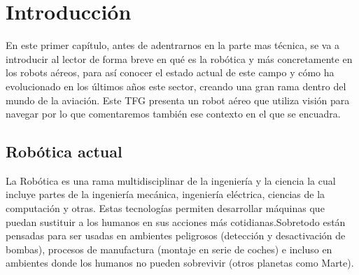 \chapter{Introducción}\label{cap.introduccion}
\hspace{1cm} En este primer capítulo, antes de adentrarnos en la parte mas técnica, se va a introducir al lector de forma breve en qué es la robótica y más concretamente en los robots aéreos, para así conocer el estado actual de este campo y cómo ha evolucionado en los últimos años este sector, creando una gran rama dentro del mundo de la aviación. Este TFG presenta un robot aéreo que utiliza visión para navegar por lo que comentaremos también ese contexto en el que se encuadra.

\section{Robótica actual}
\hspace{1cm} La Robótica es una rama multidisciplinar de la ingeniería y la ciencia la cual incluye partes de la ingeniería mecánica, ingeniería eléctrica, ciencias de la computación y otras. Estas tecnologías permiten desarrollar máquinas que puedan sustituir a los humanos en sus acciones más cotidianas.Sobretodo están pensadas para ser usadas en ambientes peligrosos (detección y desactivación de bombas), procesos de manufactura (montaje en serie de coches) e incluso en ambientes donde los humanos no pueden sobrevivir (otros planetas como Marte).

